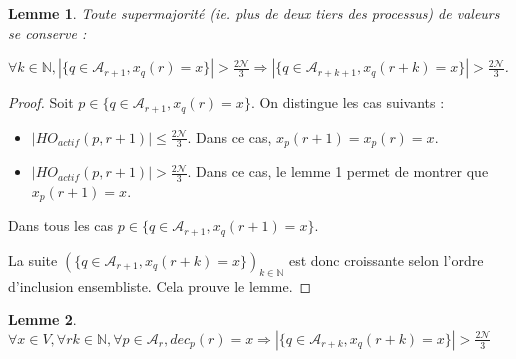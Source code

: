\documentclass{article}
\newtheorem{lemma}{Lemme}
\begin{document}
\begin{lemma}

Toute supermajorité (ie. plus de deux tiers des processus) de valeurs se conserve :

	$\forall k \in \mathds{N}, | \{ q \in \mathcal{A}_{r+1} , x_q(r) = x \} | > \frac{2\mathcal{N}}{3} \Rightarrow | \{ q \in \mathcal{A}_{r+k+1} , x_q(r+k) = x \} | > \frac{2\mathcal{N}}{3}$.

\end{lemma}

\begin{proof}

Soit $p \in  \{ q \in \mathcal{A}_{r+1} , x_q(r) = x \} $. On distingue les cas suivants :

\begin{itemize}

\item $|HO_{actif} (p, r+1) | \leq \frac{2\mathcal{N}}{3}$. Dans ce cas, $x_p(r+1) = x_p(r) = x$.
\item $|HO_{actif} (p, r+1) | > \frac{2\mathcal{N}}{3}$. Dans ce cas, le lemme 1 permet de montrer que $x_p(r+1) = x$.

\end{itemize}
Dans tous les cas 
	$p \in \{ q \in \mathcal{A}_{r+1} , x_q(r+1) = x \} $.

	La suite $(\{ q \in \mathcal{A}_{r+1} , x_q(r+k) = x \})_{k \in \mathds{N}}$ est donc croissante selon l'ordre d'inclusion ensembliste. Cela prouve le lemme.
\end{proof}
\begin{lemma}
	$\forall x \in V, \forall r k \in \mathds{N}, \forall p \in \mathcal{A}_r, dec_p(r) = x \Rightarrow| \{ q \in \mathcal{A}_{r+k} , x_q(r+k) = x \} | > \frac{2\mathcal{N}}{3}$
\end{lemma}
\end{document}
